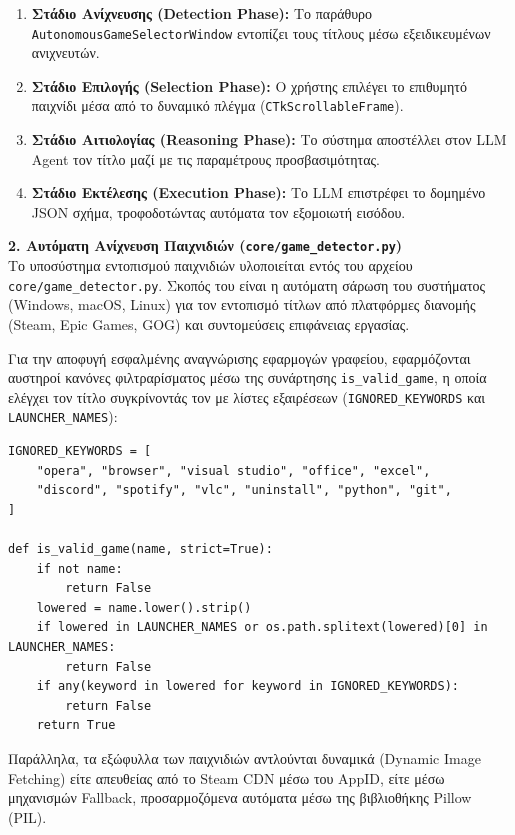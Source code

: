 \documentclass[twoside, a4paper, 11pt]{article}
\newcommand{\textlatin}[1]{\textenglish{#1}}
\begin{document}
\begin{enumerate}
    \item \textbf{Στάδιο Ανίχνευσης (Detection Phase):} Το παράθυρο \texttt{AutonomousGameSelectorWindow} εντοπίζει τους τίτλους μέσω εξειδικευμένων ανιχνευτών.
    \item \textbf{Στάδιο Επιλογής (Selection Phase):} Ο χρήστης επιλέγει το επιθυμητό παιχνίδι μέσα από το δυναμικό πλέγμα (\texttt{CTkScrollableFrame}).
    \item \textbf{Στάδιο Αιτιολογίας (Reasoning Phase):} Το σύστημα αποστέλλει στον \textlatin{LLM Agent} τον τίτλο μαζί με τις παραμέτρους προσβασιμότητας.
    \item \textbf{Στάδιο Εκτέλεσης (Execution Phase):} Το \textlatin{LLM} επιστρέφει το δομημένο \textlatin{JSON} σχήμα, τροφοδοτώντας αυτόματα τον εξομοιωτή εισόδου.
\end{enumerate}

\textbf{2. Αυτόματη Ανίχνευση Παιχνιδιών (\texttt{core/game\_detector.py})}\\
Το υποσύστημα εντοπισμού παιχνιδιών υλοποιείται εντός του αρχείου \texttt{core/game\_detector.py}. Σκοπός του είναι η αυτόματη σάρωση του συστήματος (\textlatin{Windows, macOS, Linux}) για τον εντοπισμό τίτλων από πλατφόρμες διανομής (\textlatin{Steam, Epic Games, GOG}) και συντομεύσεις επιφάνειας εργασίας.

Για την αποφυγή εσφαλμένης αναγνώρισης εφαρμογών γραφείου, εφαρμόζονται αυστηροί κανόνες φιλτραρίσματος μέσω της συνάρτησης \texttt{is\_valid\_game}, η οποία ελέγχει τον τίτλο συγκρίνοντάς τον με λίστες εξαιρέσεων (\texttt{IGNORED\_KEYWORDS} και \texttt{LAUNCHER\_NAMES}):

\begin{verbatim}
IGNORED_KEYWORDS = [
    "opera", "browser", "visual studio", "office", "excel",
    "discord", "spotify", "vlc", "uninstall", "python", "git",
]

def is_valid_game(name, strict=True):
    if not name:
        return False
    lowered = name.lower().strip()
    if lowered in LAUNCHER_NAMES or os.path.splitext(lowered)[0] in LAUNCHER_NAMES:
        return False
    if any(keyword in lowered for keyword in IGNORED_KEYWORDS):
        return False
    return True
\end{verbatim}

Παράλληλα, τα εξώφυλλα των παιχνιδιών αντλούνται δυναμικά (\textlatin{Dynamic Image Fetching}) είτε απευθείας από το \textlatin{Steam CDN} μέσω του \textlatin{AppID}, είτε μέσω μηχανισμών \textlatin{Fallback}, προσαρμοζόμενα αυτόματα μέσω της βιβλιοθήκης \textlatin{Pillow (PIL)}.
\end{document}

